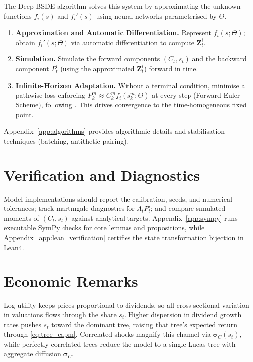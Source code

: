 ﻿\documentclass[11pt,letterpaper,oneside]{article}
\numberwithin{equation}{section}
\newcommand{\1}{\mathbf{1}}
\begin{document}
The Deep BSDE algorithm solves this system by approximating the unknown functions $f_i(s)$ and $f_i'(s)$ using neural networks parameterised by $\Theta$.
\begin{enumerate}[leftmargin=1.25em]
  \item \textbf{Approximation and Automatic Differentiation.} Represent $f_i(s;\Theta)$; obtain $f_i'(s;\Theta)$ via automatic differentiation to compute $\bm{Z}_t^i$.
  \item \textbf{Simulation.} Simulate the forward components $(C_t, s_t)$ and the backward component $P_t^i$ (using the approximated $\bm{Z}_t^i$) forward in time.
  \item \textbf{Infinite-Horizon Adaptation.} Without a terminal condition, minimise a pathwise loss enforcing $P_k^m \approx C_k^m f_i(s_k^m;\Theta)$ at every step (Forward Euler Scheme), following \cite{huang2025probabilistic}. This drives convergence to the time-homogeneous fixed point.
\end{enumerate}
Appendix~\ref{app:algorithms} provides algorithmic details and stabilisation techniques (batching, antithetic pairing).

\section{Verification and Diagnostics}\label{sec:verification}

Model implementations should report the calibration, seeds, and numerical tolerances; track martingale diagnostics for $\Lambda_t P_t^i$; and compare simulated moments of $(C_t,s_t)$ against analytical targets. Appendix~\ref{app:sympy} runs executable SymPy checks for core lemmas and propositions, while Appendix~\ref{app:lean_verification} certifies the state transformation bijection in Lean4.

\section{Economic Remarks}
Log utility keeps prices proportional to dividends, so all cross-sectional variation in valuations flows through the share $s_t$. Higher dispersion in dividend growth rates pushes $s_t$ toward the dominant tree, raising that tree's expected return through \eqref{eq:tree_capm}. Correlated shocks magnify this channel via $\bm{\sigma}_C(s_t)$, while perfectly correlated trees reduce the model to a single Lucas tree with aggregate diffusion $\bm{\sigma}_C$.

\appendix
\end{document}
